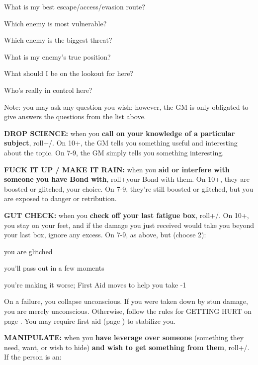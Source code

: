 \documentclass[oneside,10pt]{article}
\begin{document}
\begin{multicols}{2}
\begin{dent}
\tcirc{} What is my best escape/access/evasion route?

\tcirc{} Which enemy is most vulnerable?

\tcirc{} Which enemy is the biggest threat?

\tcirc{} What is my enemy’s true position?

\tcirc{} What should I be on the lookout for here?

\tcirc{} Who’s really in control here?
\end{dent}

Note: you may ask any question you wish; however, the GM
is only obligated to give answers the questions from the list
above.

\label{move_dropscience}
\textbf{DROP SCIENCE:} when you \textbf{call on your knowledge of a
particular subject}, roll+\mastery/. On 10+, the GM tells you
something useful and interesting about the topic. On 7-9, the
GM simply tells you something interesting.

\label{move_fuckitup}
\textbf{FUCK IT UP / MAKE IT RAIN:} when you \textbf{aid or interfere
with someone you have Bond with}, roll+your Bond with
them. On 10+, they are boosted or glitched, your choice. On
7-9, they’re still boosted or glitched, but you are exposed to
danger or retribution.

\label{move_gutcheck}
\textbf{GUT CHECK:} when you \textbf{check off your last fatigue box},
roll+\oomph/. On 10+, you stay on your feet, and if the damage you
just received would take you beyond your last box, ignore
any excess. On 7-9, as above, but (choose 2):
\begin{dent}

\tcirc{} you are glitched

\tcirc{} you’ll pass out in a few moments

\tcirc{} you’re making it worse; First Aid moves to help you
take -1
\end{dent}

On a failure, you collapse unconscious. If you were taken down by stun
damage, you are merely unconscious. Otherwise, follow the rules for
GETTING HURT on page \pageref{gettinghurt}. You may require first aid (page
\pageref{move_firstaid}) to stabilize you.

\label{move_manipulate}
\textbf{MANIPULATE:} when you \textbf{have leverage over someone}
(something they need, want, or wish to hide) \textbf{and wish to
get something from them}, roll+\flair/. If the
person is an:
\begin{dent}


\end{dent}
\end{multicols}
\end{document}
